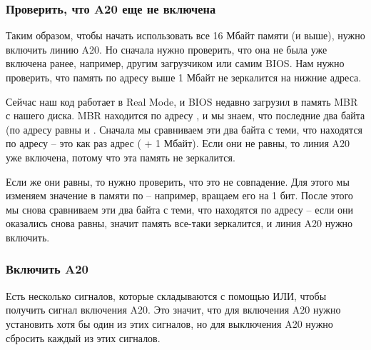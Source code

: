 \documentclass[a4page]{article}
\begin{document}
\subsubsection{Проверить, что A20 еще не включена}
Таким образом, чтобы начать использовать все 16 Мбайт памяти (и выше), нужно включить линию A20.
Но сначала нужно проверить, что она не была уже включена ранее, например, другим загрузчиком или самим BIOS.
Нам нужно проверить, что память по адресу выше 1 Мбайт не зеркалится на нижние адреса.

Сейчас наш код работает в Real Mode, и BIOS недавно загрузил в память MBR с нашего диска.
MBR находится по адресу , и мы знаем, что последние два байта (по адресу  равны  и .
Сначала мы сравниваем эти два байта с теми, что находятся по адресу 
-- это как раз адрес ( + 1 Мбайт).
Если они не равны, то линия A20 уже включена, потому что эта память не зеркалится.

Если же они равны, то нужно проверить, что это не совпадение.
Для этого мы изменяем значение в памяти по  --
например, вращаем его на 1 бит.
После этого мы снова сравниваем эти два байта с теми, что находятся по адресу  --
если они оказались снова равны, значит память все-таки зеркалится, и линия A20 нужно включить.

\subsubsection{Включить A20}

Есть несколько сигналов, которые складываются с помощью ИЛИ, чтобы получить сигнал включения A20.
Это значит, что для включения A20 нужно установить хотя бы один из этих сигналов,
но для выключения A20 нужно сбросить каждый из этих сигналов.
\end{document}
